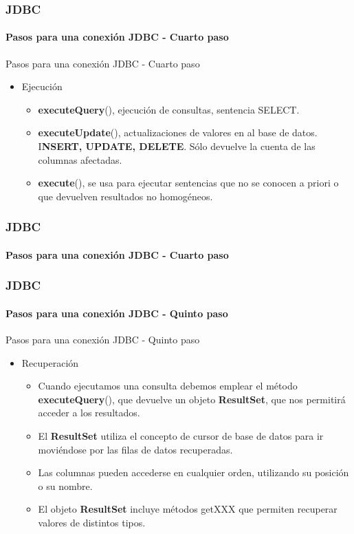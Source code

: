 \documentclass{beamer}
\begin{document}
	\begin{frame}
		\frametitle{JDBC}
		\framesubtitle{Pasos para una conexi\'on JDBC - Cuarto paso}

        \begin{exampleblock}{Pasos para una conexi\'on JDBC - Cuarto paso}
		    \begin{itemize}
		        \item Ejecuci\'on
		        \begin{itemize}
		            \item \textbf{executeQuery}(), ejecuci\'on de consultas, sentencia SELECT.
		            \item \textbf{executeUpdate}(), actualizaciones de valores en al base de datos. I\textbf{NSERT, UPDATE, DELETE}. S\'olo devuelve la cuenta de las columnas afectadas.
		            \item \textbf{execute}(), se usa para ejecutar sentencias que no se conocen a priori o que devuelven resultados no homog\'eneos.
		        \end{itemize}
		    \end{itemize}
		    \end{exampleblock}
	\end{frame}    		
	
    \begin{frame}
		\frametitle{JDBC}
		\framesubtitle{Pasos para una conexi\'on JDBC - Cuarto paso}

               
	\end{frame}			
	
	\begin{frame}
		\frametitle{JDBC}
		\framesubtitle{Pasos para una conexi\'on JDBC - Quinto paso}

        \begin{exampleblock}{Pasos para una conexi\'on JDBC - Quinto paso}
		    \begin{itemize}
		        \item Recuperaci\'on
		        \begin{itemize}
		            \item Cuando ejecutamos una consulta debemos emplear el m\'etodo \textbf{executeQuery}(), que devuelve un objeto \textbf{ResultSet}, que nos permitir\'a acceder a los resultados.
		            \item El \textbf{ResultSet} utiliza el concepto de cursor de base de datos para ir movi\'endose por las filas de datos recuperadas.
		            \item Las columnas pueden accederse en cualquier orden, utilizando su posici\'on o su nombre.
		            \item El objeto \textbf{ResultSet} incluye m\'etodos getXXX que permiten recuperar valores de distintos tipos.
		        \end{itemize}
		    \end{itemize}
		    \end{exampleblock}
	\end{frame}   	
	
\end{document}
